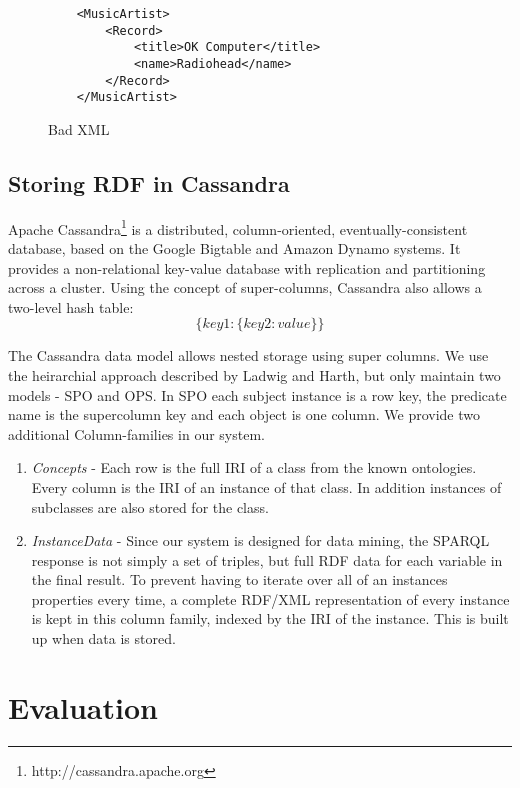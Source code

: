 \documentclass[journal]{IEEEtran}
\begin{document}
\begin{figure}
    \caption{Bad XML}
    \label{ex:xml-bad}
    \begin{verbatim}
    <MusicArtist>
        <Record>
            <title>OK Computer</title>
            <name>Radiohead</name>
        </Record>
    </MusicArtist>
    \end{verbatim}
\end{figure}

\subsection{Storing RDF in Cassandra}

Apache Cassandra\footnote{http://cassandra.apache.org} is a distributed,
column-oriented, eventually-consistent database, based on the Google
Bigtable\cite{Chang06bigtable:a} and Amazon
Dynamo\cite{Hastorun07dynamo} systems. It provides a non-relational
key-value database with replication and partitioning across a cluster. Using
the concept of super-columns, Cassandra also allows a two-level hash table:
$$\{ key1 : \{ key2 : value \} \}$$

The Cassandra data model allows nested storage using super columns. We use the
heirarchial approach described by Ladwig and Harth\cite{ladwig:11}, but only
maintain two models - SPO and OPS. In SPO each subject instance is a row key,
the predicate name is the supercolumn key and each object is one column. We
provide two additional Column-families in our system.

\begin{enumerate}
    \item \emph{Concepts} - Each row is the full IRI of a class from the known
        ontologies. Every column is the IRI of an instance of that class. In
        addition instances of subclasses are also stored for the class.

    \item \emph{InstanceData} - Since our system is designed for data mining,
        the SPARQL response is not simply a set of triples, but full RDF data
        for each variable in the final result. To prevent having to iterate
        over all of an instances properties every time, a complete RDF/XML
        representation of every instance is kept in this column family, indexed
        by the IRI of the instance. This is built up when data is stored.

\end{enumerate}

\section{Evaluation}
\end{document}
